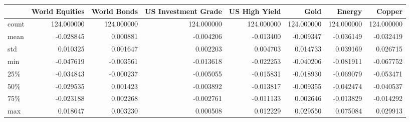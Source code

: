 \begin{tabular}{lrrrrrrr}
\toprule
{} &  World Equities &  World Bonds &  US Investment Grade &  US High Yield &        Gold &      Energy &      Copper \\
\midrule
count &      124.000000 &   124.000000 &           124.000000 &     124.000000 &  124.000000 &  124.000000 &  124.000000 \\
mean  &       -0.028845 &     0.000881 &            -0.004206 &      -0.013400 &   -0.009347 &   -0.036149 &   -0.032419 \\
std   &        0.010325 &     0.001647 &             0.002203 &       0.004703 &    0.014733 &    0.039169 &    0.026715 \\
min   &       -0.047619 &    -0.003561 &            -0.013618 &      -0.022253 &   -0.040206 &   -0.081911 &   -0.067752 \\
25\%   &       -0.034843 &    -0.000237 &            -0.005055 &      -0.015831 &   -0.018930 &   -0.069079 &   -0.053471 \\
50\%   &       -0.029535 &     0.001423 &            -0.003892 &      -0.013817 &   -0.009355 &   -0.042474 &   -0.040537 \\
75\%   &       -0.023188 &     0.002268 &            -0.002761 &      -0.011133 &    0.002646 &   -0.013829 &   -0.014292 \\
max   &        0.018647 &     0.003230 &             0.000508 &       0.012229 &    0.029550 &    0.075084 &    0.029913 \\
\bottomrule
\end{tabular}
